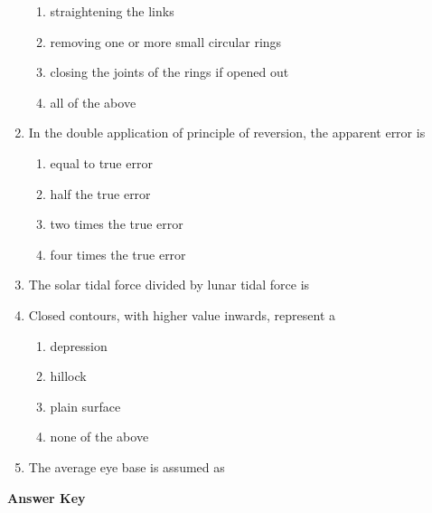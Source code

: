 \documentclass[11pt,a4paper]{article}
\begin{document}
\begin{enumerate}
\begin{enumerate}[label=\Alph*.]
\item{straightening the links}
\item{removing one or more small circular rings}
\item{closing the joints of the rings if opened out}
\item{all of the above}
\end{enumerate}
\item{In the double application of principle of reversion, the apparent error is}
\begin{enumerate}[label=\Alph*.]
\item{equal to true error}
\item{half the true error}
\item{two times the true error}
\item{four times the true error}
\end{enumerate}
\item{The solar tidal force divided by lunar tidal force is}
\\
\item{Closed contours, with higher value inwards, represent a}
\begin{enumerate}[label=\Alph*.]
\item{depression}
\item{hillock}
\item{plain surface}
\item{none of the above}
\end{enumerate}
\item{The average eye base is assumed as}
\\\begin{enumerate*}[itemjoin=\qquad, label=\Alph*.]
\item{58 mm}
\item{60 mm}
\item{62 mm}
\item{64 mm}
\end{enumerate*}
\end{enumerate}
\textbf{Answer Key}
\end{document}
